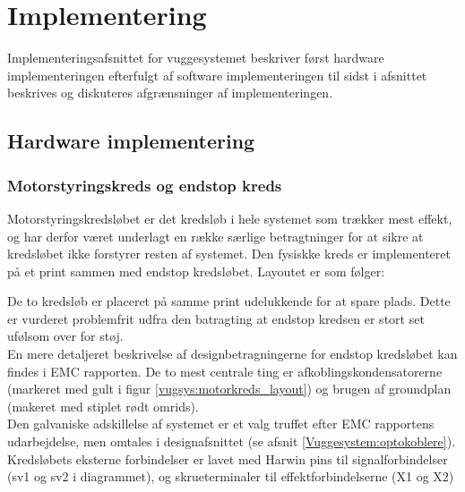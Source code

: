 \section{Implementering}
\label{Vuggesystem: Implementering} 
Implementeringsafsnittet for vuggesystemet beskriver først hardware implementeringen efterfulgt af software implementeringen til sidst i afsnittet beskrives og diskuteres afgrænsninger af implementeringen.
\subsection{Hardware implementering}
\subsubsection{Motorstyringskreds og endstop kreds}
Motorstyringskredsløbet er det kredsløb i hele systemet som trækker mest effekt, og har derfor været underlagt en række særlige betragtninger for at sikre at kredsløbet ikke forstyrer resten af systemet. Den fysiskke kreds er implementeret på et print sammen med endstop kredsløbet. Layoutet er som følger:


De to kredsløb er placeret på samme print udelukkende for at spare plads. Dette er vurderet problemfrit udfra den batragting at endstop kredsen er stort set ufølsom over for støj.\\

En mere detaljeret beskrivelse af designbetragningerne for endstop kredsløbet kan findes i EMC rapporten. De to mest centrale ting er afkoblingskondensatorerne (markeret med gult i figur \ref{vugsys:motorkreds_layout}) og brugen af groundplan (makeret med stiplet rødt omrids). \\

Den galvaniske adskillelse af systemet er et valg truffet efter EMC rapportens udarbejdelse, men omtales i designafsnittet (se afsnit \vref{Vuggesystem:optokoblere}).\\

Kredsløbets eksterne forbindelser er lavet med Harwin pins til signalforbindelser (sv1 og sv2 i diagrammet), og skrueterminaler til effektforbindelserne (X1 og X2)

\newpage
